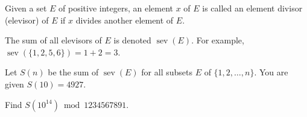 Given a set $E$ of positive integers, an element $x$ of $E$ is called an element divisor (elevisor) of $E$ if $x$ divides another element of $E$.

The sum of all elevisors of $E$ is denoted $\operatorname{sev}(E)$.
For example, $\operatorname{sev}(\{1, 2, 5, 6\}) = 1 + 2 = 3$.

Let $S(n)$ be the sum of $\operatorname{sev}(E)$ for all subsets $E$ of $\{1, 2, \dots, n\}$.
You are given $S(10) = 4927$.

Find $S(10^{14}) \bmod 1234567891$.
